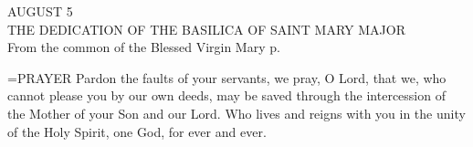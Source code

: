 \begin{center}\normalsize AUGUST 5\\
\footnotesize THE DEDICATION OF THE BASILICA OF SAINT MARY MAJOR\\
\footnotesize From the common of the Blessed Virgin Mary p. \\
\end{center}

\hangindent=\parindent \small{PRAYER 
Pardon the faults of your servants, we pray, O Lord,
that we, who cannot please you by our own deeds,
may be saved through the intercession
of the Mother of your Son and our Lord.
Who lives and reigns with you in the unity of the Holy Spirit,
one God, for ever and ever.\\}
 
